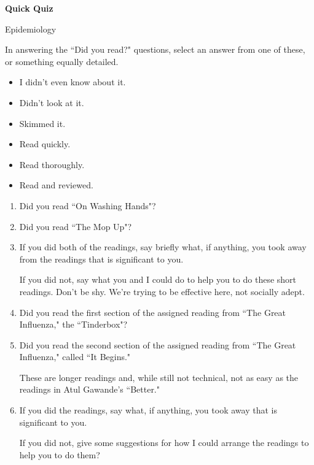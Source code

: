 \hspace*{3in}{This quiz is anonymous.}

\bigskip

\bigskip

\centerline{\Large \bfseries Quick Quiz}

\bigskip

\centerline{\large \sf Epidemiology}

\bigskip

\bigskip

In answering the ``Did you read?" questions, select an answer from one of these, or something equally detailed.


\begin{itemize}
\item I didn't even know about it. 
\item Didn't look at it.  
\item Skimmed it. 
\item Read quickly. 
\item Read thoroughly.
\item Read and reviewed.
\end{itemize}

\bigskip

\begin{enumerate}
\item  Did you read ``On Washing Hands"? 

\item Did you read ``The Mop Up"?

\item If you did both of the readings, say briefly what, if anything, you took away from the readings that is significant to you.

If you did not, say what you and I could do to help you to do these short readings. Don't be shy.  We're trying to be effective here, not socially adept.

\vspace*{1in}

\item Did you read the first section of the assigned reading from ``The Great Influenza," the ``Tinderbox"?

\item Did you read the second section of the assigned reading from ``The Great Influenza," called ``It Begins."

These are longer readings and, while still not technical, not as easy as the readings in Atul Gawande's ``Better."  

\item If you did the readings, say what, if anything, you took away that is significant to you.

If you did not, give some suggestions for how I could arrange the readings to help you to do them?  

\end{enumerate}